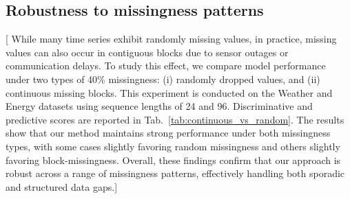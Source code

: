 \documentclass{article}
\theoremstyle{plain}
\theoremstyle{definition}
\theoremstyle{remark}
\newcommand {\idan}[1]{{\color{red}[#1]}}
\begin{document}
\begin{table}[t]
    \centering
    \caption{Discriminative and predictive scores for 40\% random vs. 40\% continuous missingness on the Weather and Energy datasets with sequence lengths of 24 and 96. Lower is better.}
    \label{tab:continuous_vs_random}
\end{table}

\vspace{-2mm}
\subsection{Robustness to missingness patterns}
\vspace{-2mm}
\idan{
 While many time series exhibit randomly missing values, in practice, missing values can also occur in contiguous blocks due to sensor outages or communication delays. To study this effect, we compare model performance under two types of 40\% missingness: (i) randomly dropped values, and (ii) continuous missing blocks. This experiment is conducted on the Weather and Energy datasets using sequence lengths of 24 and 96. Discriminative and predictive scores are reported in Tab.~\ref{tab:continuous_vs_random}. The results show that our method maintains strong performance under both missingness types, with some cases slightly favoring random missingness and others slightly favoring block-missingness. Overall, these findings confirm that our approach is robust across a range of missingness patterns, effectively handling both sporadic and structured data gaps.}
\end{document}
